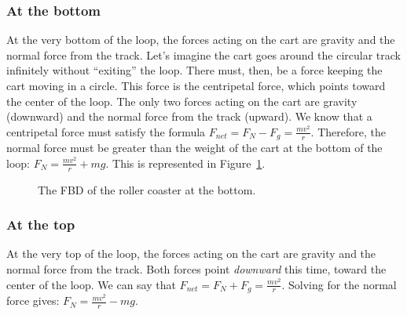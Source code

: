 \subsubsection{At the bottom}
At the very bottom of the loop, the forces acting on the cart are gravity and the normal force from the track. Let's imagine the cart goes around the circular track infinitely without ``exiting'' the loop. There must, then, be a force keeping the cart moving in a circle. This force is the centripetal force, which points toward the center of the loop. The only two forces acting on the cart are gravity (downward) and the normal force from the track (upward). We know that a centripetal force must satisfy the formula $F_{net} = F_N - F_g = \frac{mv^2}{r}$. Therefore, the normal force must be greater than the weight of the cart at the bottom of the loop: $F_N = \frac{mv^2}{r} + mg$. This is represented in Figure~\ref{fig:roller_bottom}.

\begin{figure}[H]
  \centering
  \caption{The FBD of the roller coaster at the bottom.}
  \label{fig:roller_bottom}
\end{figure}
\subsubsection{At the top}
At the very top of the loop, the forces acting on the cart are gravity and the normal force from the track. Both forces point \emph{downward} this time, toward the center of the loop. We can say that $F_{net} = F_N + F_g = \frac{mv^2}{r}$. Solving for the normal force gives: $F_N = \frac{mv^2}{r} - mg$.

